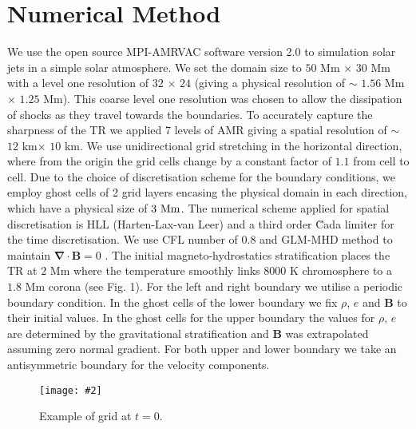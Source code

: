 \documentclass[12pt]{ociamthesis}
\newcommand{\bs}[1]{\boldsymbol{#1}}
\newcommand{\mfig}[4]{
  \begin{figure}
  \begin{center}
  \texttt{[image: \#2]}
  \caption{#3}
  \label{#4}
  \end{center}
  \end{figure}}
\begin{document}
\section{Numerical Method}
\label{sec:Numerical_Method}
We use the open source MPI-AMRVAC software version 2.0 \cite{Xia_2017} to simulation solar jets in a simple solar atmosphere. We set the domain size to $50$ Mm $\times$ $30$ Mm with a level one resolution of $32$ $\times$ $24$ (giving a physical resolution of $\sim$ $1.56$ Mm $\times$ $1.25$ Mm). This coarse level one resolution was chosen to allow the dissipation of shocks as they travel towards the boundaries. To accurately capture the sharpness of the TR we applied 7 levels of AMR giving a spatial resolution of $\sim$ $12$ km$\times$ $10$ km. We use unidirectional grid stretching in the horizontal direction, where from the origin the grid cells change by a constant factor of $1.1$ from cell to cell. Due to the choice of discretisation scheme for the boundary conditions, we employ ghost cells of 2 grid layers encasing the physical domain in each direction, which have a physical size of $3 \ \rm{Mm}$. The numerical scheme applied for spatial discretisation is HLL (Harten-Lax-van Leer) \cite{hll_1983} and a third order \u{C}ada limiter \citep{CADA20094118} for the time discretisation. We use CFL number of $0.8$ and GLM-MHD method to maintain $\bs{\nabla} \cdot \bs{B}=0$ \citep{DEDNER2002645}. The initial magneto-hydrostatics stratification places the TR at $2$ Mm where the temperature smoothly links $8000$ K chromosphere to a $1.8$ Mm corona (see Fig. 1). For the left and right boundary we utilise a periodic boundary condition. In the  ghost cells of the lower boundary we fix $\rho$, $e$ and $\bs{B}$ to their initial values. In the ghost cells for the upper boundary the values for $\rho$, $e$ are determined by the gravitational stratification and $\bs{B}$ was extrapolated assuming zero normal gradient. For both upper and lower boundary we take an antisymmetric boundary for the velocity components.
\mfig{1}{figures/grid_example_whole.png}{Example of grid at $t=0$.}{atoms_profile}
\end{document}
